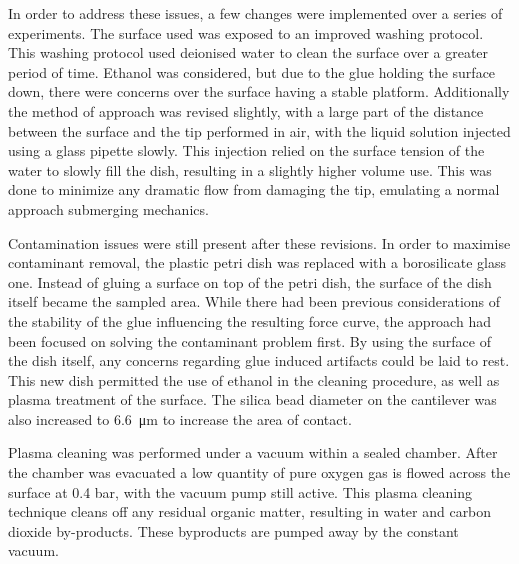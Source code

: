 In order to address these issues, a few changes were implemented over a series of experiments. The surface used was exposed to an improved washing protocol. This washing protocol used deionised water to clean the surface over a greater period of time. Ethanol was considered, but due to the glue holding the surface down, there were concerns over the surface having a stable platform. Additionally the method of approach was revised slightly, with a large part of the distance between the surface and the tip performed in air, with the liquid solution injected using a glass pipette slowly. This injection relied on the surface tension of the water to slowly fill the dish, resulting in a slightly higher volume use. This was done to minimize any dramatic flow from damaging the tip, emulating a normal approach submerging mechanics. %

Contamination issues were still present after these revisions. In order to maximise contaminant removal, the plastic petri dish was replaced with a borosilicate glass one. Instead of gluing a surface on top of the petri dish, the surface of the dish itself became the sampled area. While there had been previous considerations of the stability of the glue influencing the resulting force curve, the approach had been focused on solving the contaminant problem first. By using the surface of the dish itself, any concerns regarding glue induced artifacts could be laid to rest. This new dish permitted the use of ethanol in the cleaning procedure, as well as plasma treatment of the surface. The silica bead diameter on the cantilever was also increased to \SI{6.6}{\micro\metre} to increase the area of contact. 

Plasma cleaning was performed under a vacuum within a sealed chamber. After the chamber was evacuated a low quantity of pure oxygen gas is flowed across the surface at 0.4 bar, with the vacuum pump still active. This plasma cleaning technique cleans off any residual organic matter, resulting in water and carbon dioxide by-products. These byproducts are pumped away by the constant vacuum. \cite{PlasUV} \cite{PlasTreat} \cite{SilicaAFMCleaning}


